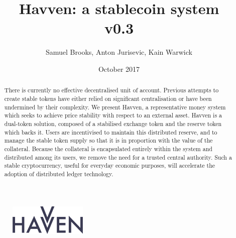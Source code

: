 \documentclass{article}
\begin{document}
\newcommand{\CUR}{\textsc{cur}}
\newcommand{\NOM}{\textsc{nom}}


\title{Havven: a stablecoin system\\ v0.3}
\author{Samuel Brooks, Anton Jurisevic, Kain Warwick}
\date{October 2017}


\begin{figure}
    \centering
    \includegraphics[width=0.33\textwidth]{img/havvenlogo}
\end{figure}
\maketitle

\hfill

\begin{abstract}
\noindent There is currently no effective decentralised unit of account. Previous attempts to create
stable tokens have either relied on significant centralisation or have been undermined by their
complexity. We present Havven, a representative money system which seeks to achieve price
stability with respect to an external asset. Havven is a dual-token solution, composed of a
stabilised exchange token and the reserve token which backs it. Users are incentivised to maintain
this distributed reserve, and to manage the stable token supply so that it is in proportion with the
value of the collateral. Because the collateral is encapsulated entirely within the system and
distributed among its users, we remove the need for a trusted central authority.
Such a stable cryptocurrency, useful for everyday economic purposes, will accelerate the adoption of
distributed ledger technology.
\end{abstract}

\listoftodos{}

\pagebreak




% 





\end{document}
